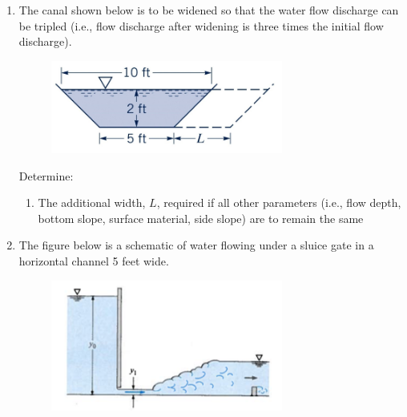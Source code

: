 \documentclass[12pt]{article}
\begin{document}
\begin{enumerate}
\clearpage

\item 
The canal shown below is to be widened so that the water flow discharge can be tripled (i.e., flow discharge after widening is three times the initial flow discharge). 

\begin{figure}[htbp] %
   \centering
   \includegraphics[width=3in]{trapezoid.png} 
   \caption{}
   \label{fig:continunity}
\end{figure}

Determine:
\begin{enumerate}
\item The additional width, $L$, required if all other parameters (i.e., flow depth, bottom slope, surface material, side slope) are to remain the same
\end{enumerate}
\clearpage
\item The figure below is a schematic of water flowing under a sluice gate in a horizontal channel 5 feet wide.

\begin{figure}[htbp] %
   \centering
   \includegraphics[width=3in]{sluicegate.png} 
   \caption{}
   \label{fig:venturiflow}
\end{figure}


\end{enumerate}
\end{document}
